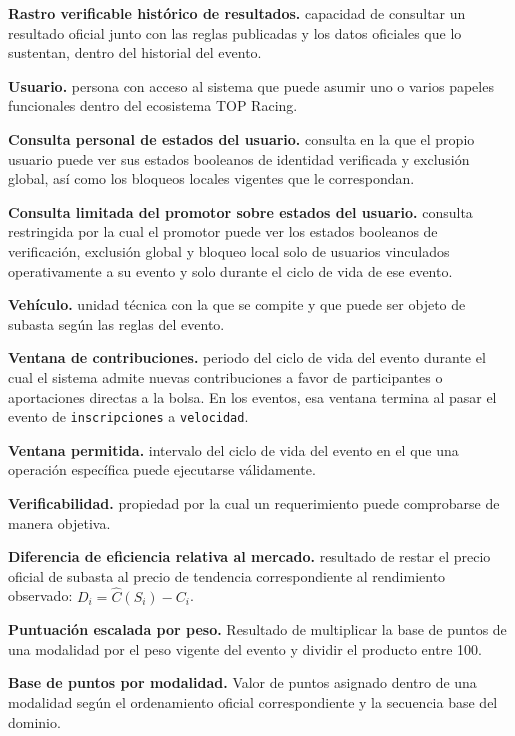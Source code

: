 \documentclass[10pt,letterpaper]{article}
\begin{document}
\noindent\textbf{Rastro verificable histórico de resultados.} capacidad de consultar un resultado oficial junto con las reglas publicadas y los datos oficiales que lo sustentan, dentro del historial del evento.\par
\noindent\textbf{Usuario.} persona con acceso al sistema que puede asumir uno o varios papeles funcionales dentro del ecosistema TOP Racing.\par
\noindent\textbf{Consulta personal de estados del usuario.} consulta en la que el propio usuario puede ver sus estados booleanos de identidad verificada y exclusión global, así como los bloqueos locales vigentes que le correspondan.\par
\noindent\textbf{Consulta limitada del promotor sobre estados del usuario.} consulta restringida por la cual el promotor puede ver los estados booleanos de verificación, exclusión global y bloqueo local solo de usuarios vinculados operativamente a su evento y solo durante el ciclo de vida de ese evento.\par
\noindent\textbf{Vehículo.} unidad técnica con la que se compite y que puede ser objeto de subasta según las reglas del evento.\par
\noindent\textbf{Ventana de contribuciones.} periodo del ciclo de vida del evento durante el cual el sistema admite nuevas contribuciones a favor de participantes o aportaciones directas a la bolsa. En los eventos, esa ventana termina al pasar el evento de \texttt{inscripciones} a \texttt{velocidad}.\par
\noindent\textbf{Ventana permitida.} intervalo del ciclo de vida del evento en el que una operación específica puede ejecutarse válidamente.\par
\noindent\textbf{Verificabilidad.} propiedad por la cual un requerimiento puede comprobarse de manera objetiva.\par
\noindent\textbf{Diferencia de eficiencia relativa al mercado.} resultado de restar el precio oficial de subasta al precio de tendencia correspondiente al rendimiento observado: $D_i=\widehat C(S_i)-C_i$.\par
\noindent\textbf{Puntuación escalada por peso.} Resultado de multiplicar la base de puntos de una modalidad por el peso vigente del evento y dividir el producto entre 100.\par
\noindent\textbf{Base de puntos por modalidad.} Valor de puntos asignado dentro de una modalidad según el ordenamiento oficial correspondiente y la secuencia base del dominio.\par
\end{document}
